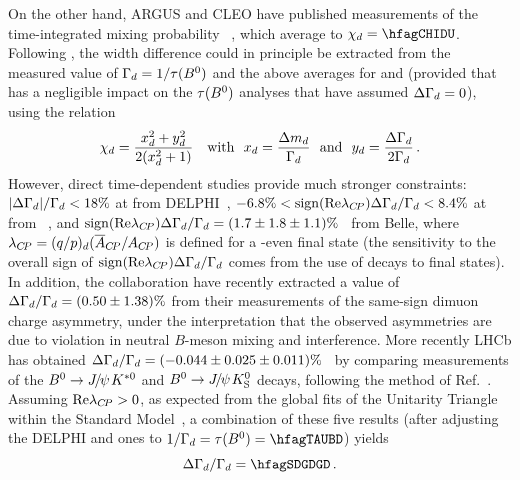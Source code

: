 On the other hand, ARGUS and CLEO have published 
measurements of the time-integrated mixing probability 
\chid~\cite{Albrecht:1992yd,*Albrecht:1993gr_cont,Bartelt:1993cf,Behrens:2000qu}, 
which average to $\chid =\hfagCHIDU$.
Following , 
the width difference \DGd could 
in principle be extracted from the
measured value of $\Gamma_{d}=1/\tau(B^0)$ and the above averages for 
\dmd and \chid 
(provided that \DGd has a negligible impact on 
the \dmd $\tau(B^0)$ analyses that have assumed $\Delta\Gamma_{d}=0$), 
using the relation
\begin{equation}
\chid = \frac{\xd^2+\yd^2}{2(\xd^2+1)} ~~~ \mbox{with} ~~ \xd=\frac{\dmd}{\Gd} 
~~ \mbox{and} ~~ \yd=\frac{\DGd}{2\Gd} \,.
\labe{chid_definition}
\end{equation}
However, direct time-dependent studies provide much stronger constraints: 
$|\Delta\Gamma_{d}|/\Gamma_{d} < 18\%$ at  from DELPHI~\cite{Abdallah:2002mr},
$-6.8\% < {\rm sign}({\rm Re} \lambda_{C\!P}) \Delta\Gamma_{d}/\Gamma_{d} < 8.4\%$
at  from \babar~\cite{Aubert:2003hd,*Aubert:2004xga_mod_cont},
and ${\rm sign}({\rm Re} \lambda_{C\!P})\Delta\Gamma_{d}/\Gamma_{d} = (1.7 \pm 1.8 \pm 1.1)\%$~\cite{Higuchi:2012kx}
from Belle, 
where $\lambda_{\CP} = (q/p)_{\particle{d}} (\bar{A}_{\CP}/A_{\CP})$
is defined for a \CP-even final state 
(the sensitivity to the overall sign of 
${\rm sign}({\rm Re} \lambda_{C\!P}) \Delta\Gamma_{d}/\Gamma_{d}$ comes
from the use of \Bd decays to \CP final states).
In addition, the \dzero collaboration have recently extracted a value of 
$\Delta\Gamma_{d}/\Gamma_{d}=(0.50 \pm 1.38)\%$\cite{Abazov:2013uma,*Abazov:2011yk_mod,*Abazov:2010hv_mod_cont,*Abazov:2010hj_mod_cont,*Abazov:2011yk_cont}
from their measurements of the same-sign dimuon charge asymmetry, 
under the interpretation that 
the observed asymmetries are due to \CP violation in neutral $B$-meson mixing and interference.
More recently LHCb has obtained $\Delta\Gamma_{d}/\Gamma_{d}=(-0.044 \pm 0.025 \pm 0.011)\%$~\cite{Aaij:2014owa}
by comparing measurements of the $B^0 \to {J\mskip -3mu/\mskip -2mu\psi\mskip 2mu} K^{*0}$ and $B^0 \to {J\mskip -3mu/\mskip -2mu\psi\mskip 2mu} K^0_{\rm S}$
decays, following the method of Ref.~\cite{Gershon:2010wx}.
Assuming ${\rm Re} \lambda_{C\!P} > 0$, as expected from the global fits
of the Unitarity Triangle within the Standard Model~\cite{Charles:2011va_mod,*Bona:2006ah},
a combination of these five results (after adjusting the DELPHI and \babar ones to  
$1/\Gd=\tau(\Bd)=\hfagTAUBD$) yields
\begin{equation}
\DGGd  = \hfagSDGDGD \,.
\end{equation}

